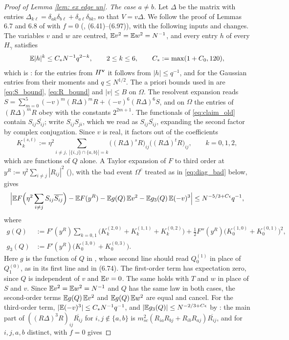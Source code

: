 \begin{proof}[Proof of Lemma \ref{lem: ex edge un}]
\textit{The case $a\ne b$.} Let $\Delta$ be the matrix with entries $\Delta_{k\ell}=\delta_{ak}\delta_{b\ell}+\delta_{a\ell}\delta_{bk}$, so that $V=v\Delta$. We follow the proof of Lemmas 6.7 and 6.8 of \cite{EKYY2} with $f=0$ (\cite{EKYY2}, (6.41)--(6.97)), with the following inputs and changes. The variables $v$ and $w$ are centred, $\mathbb{E} v^2=\mathbb{E} w^2=N^{-1}$, and every entry $h$ of every $H_\gamma$ satisfies
$$
\mathbb{E}|h|^k\le C_*N^{-1}q^{2-k}, \qquad 2\le k\le 6, \qquad C_*:=\max(1+C_0,120),
$$
which is \cite[(6.42)]{EKYY2}: for the entries from $H^{\mathbf{v}}$ it follows from $|h|\le q^{-1}$, and for the Gaussian entries from their moments and $q\le N^{1/2}$. The a priori bounds used in \cite{EKYY2} are \eqref{eq:S_bound}, \eqref{eq:R_bound} and $|v|\le B$ on $\Omega$. The resolvent expansion \cite[(6.58)]{EKYY2} reads $S=\sum_{m=0}^5(-v)^m(R\Delta)^mR+(-v)^6(R\Delta)^6S$, and on $\Omega$ the entries of $(R\Delta)^mR$ obey \cite[(6.59)--(6.61)]{EKYY2} with the constants $2^{2m+1}$. The functionals of \eqref{eq:claim_old} contain $S_{ij}\overline{S_{ij}}$; \cite[(6.46), (6.56), (6.66)]{EKYY2} write $S_{ij}S_{ji}$, which we read as $S_{ij}\overline{S_{ij}}$, expanding the second factor by complex conjugation. Since $v$ is real, it factors out of the coefficients
$$
K^{(s,t)}_k:=\eta^2\sum_{i\ne j,\;|\{i,j\}\cap\{a,b\}|=k}\big((R\Delta)^sR\big)_{ij}\overline{\big((R\Delta)^tR\big)_{ij}},\qquad k=0,1,2,
$$
which are functions of $Q$ alone. A Taylor expansion of $F$ to third order at $y^R:=\eta^2\sum_{i\ne j}|R_{ij}|^2$ (\cite[(6.63)--(6.76)]{EKYY2}), with the bad event $\Omega^c$ treated as in \eqref{eq:diag_bad} below, gives
$$
\Big|\mathbb{E} F\Big(\eta^2\sum_{i\ne j}S_{ij}\overline{S_{ij}}\Big)-\mathbb{E} F(y^R)-\mathbb{E} g(Q)\,\mathbb{E} v^2-\mathbb{E} g_3(Q)\,\mathbb{E}(-v)^3\Big|\le N^{-5/3+C\epsilon}q^{-1},
$$
where
\begin{align*}
g(Q)&:=F'(y^R)\sum_{k=0,1}\big(K^{(2,0)}_k+K^{(1,1)}_k+K^{(0,2)}_k\big)+\frac12F''(y^R)\big(K^{(1,0)}_0+K^{(0,1)}_0\big)^2,\\
g_3(Q)&:=F'(y^R)\big(K^{(3,0)}_0+K^{(0,3)}_0\big).
\end{align*}
Here $g$ is the function of $Q$ in \cite[(6.75)]{EKYY2}, whose second line should read $Q^{(1)}_0$ in place of $Q^{(0)}_1$, as in its first line and in (6.74). The first-order term has expectation zero, since $Q$ is independent of $v$ and $\mathbb{E} v=0$. The same holds with $T$ and $w$ in place of $S$ and $v$. Since $\mathbb{E} v^2=\mathbb{E} w^2=N^{-1}$ and $Q$ has the same law in both cases, the second-order terms $\mathbb{E} g(Q)\,\mathbb{E} v^2$ and $\mathbb{E} g(Q)\,\mathbb{E} w^2$ are equal and cancel. For the third-order term, $|\mathbb{E}(-v)^3|\le C_*N^{-1}q^{-1}$, and $|\mathbb{E} g_3(Q)|\le N^{-2/3+C\epsilon}$ by \cite[(6.77)--(6.86)]{EKYY2}: the main part of $((R\Delta)^3R)_{ij}\overline{R_{ij}}$ for $i,j\notin\{a,b\}$ is $m_{sc}^2(R_{ia}R_{bj}+R_{ib}R_{aj})\overline{R_{ij}}$, and for $i,j,a,b$ distinct, \cite[Lemma 6.8]{EKYY2} with $f=0$ gives

\end{proof}
